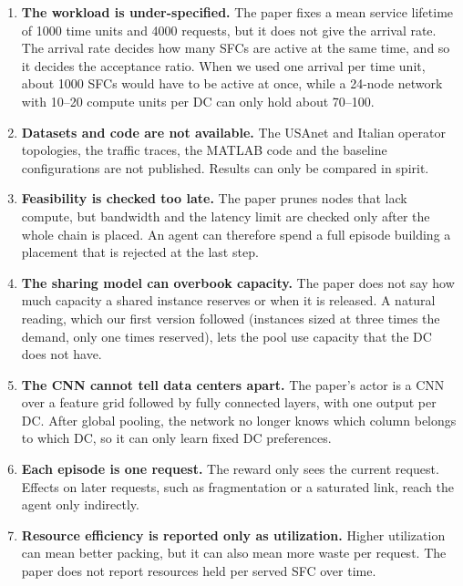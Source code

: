 \documentclass[11pt,a4paper]{article}
\begin{document}
\begin{enumerate}[label=\textbf{L\arabic*.}]
  \item \textbf{The workload is under-specified.} The paper fixes a mean
  service lifetime of 1000 time units and 4000 requests, but it does not give
  the arrival rate. The arrival rate decides how many SFCs are active at the
  same time, and so it decides the acceptance ratio. When we used one arrival
  per time unit, about 1000 SFCs would have to be active at once, while a
  24-node network with 10--20 compute units per DC can only hold about 70--100.
  \item \textbf{Datasets and code are not available.} The USAnet and Italian
  operator topologies, the traffic traces, the MATLAB code and the baseline
  configurations are not published. Results can only be compared in spirit.
  \item \textbf{Feasibility is checked too late.} The paper prunes nodes that
  lack compute, but bandwidth and the latency limit are checked only after the
  whole chain is placed. An agent can therefore spend a full episode building a
  placement that is rejected at the last step.
  \item \textbf{The sharing model can overbook capacity.} The paper does not say
  how much capacity a shared instance reserves or when it is released. A natural
  reading, which our first version followed (instances sized at three times the
  demand, only one times reserved), lets the pool use capacity that the DC does
  not have.
  \item \textbf{The CNN cannot tell data centers apart.} The paper's actor is a
  CNN over a feature grid followed by fully connected layers, with one output per
  DC. After global pooling, the network no longer knows which column belongs to
  which DC, so it can only learn fixed DC preferences.
  \item \textbf{Each episode is one request.} The reward only sees the current
  request. Effects on later requests, such as fragmentation or a saturated link,
  reach the agent only indirectly.
  \item \textbf{Resource efficiency is reported only as utilization.} Higher
  utilization can mean better packing, but it can also mean more waste per
  request. The paper does not report resources held per served SFC over time.
\end{enumerate}
\end{document}
